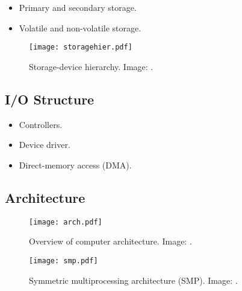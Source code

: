 \documentclass{beamer}
\begin{document}
\begin{frame}{\insertsubsectionhead}
  \begin{itemize}
    \item Primary and secondary storage.
    \item Volatile and non-volatile storage.
  \end{itemize}
\end{frame}

\begin{frame}{\insertsubsectionhead}
  \begin{figure}
    \texttt{[image: storagehier.pdf]}
    \caption{Storage-device hierarchy.
      Image: \cite[p.\ 11]{Silberschatz2009osc}.
    }
  \end{figure}
\end{frame}

\subsection{I/O Structure}

\begin{frame}{\insertsubsectionhead}
  \begin{itemize}
    \item Controllers.
    \item Device driver.
    \item Direct-memory access (DMA).
  \end{itemize}
\end{frame}

\subsection{Architecture}

\begin{frame}{\insertsubsectionhead}
  \begin{figure}
    \texttt{[image: arch.pdf]}
    \caption{Overview of computer architecture.
      Image: \cite[p. 13]{Silberschatz2009osc}.
    }
  \end{figure}
\end{frame}

\begin{frame}{\insertsubsectionhead}
  \begin{figure}
    \texttt{[image: smp.pdf]}
    \caption{Symmetric multiprocessing architecture (SMP).
      Image: \cite[p.\ 15]{Silberschatz2009osc}.
    }
  \end{figure}
\end{frame}
\end{document}
